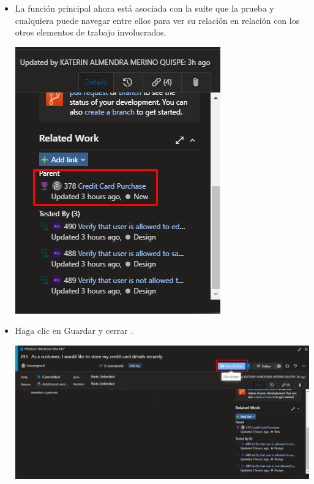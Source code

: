 \begin{itemize}
\item La función principal ahora está asociada con la suite que la prueba y cualquiera puede navegar entre ellos para ver su relación en relación con los otros elementos de trabajo involucrados.
\begin{center}
\includegraphics[width=\columnwidth]{images/27}\newline
\end{center}

\item Haga clic en Guardar y cerrar .
\begin{center}
\includegraphics[width=\columnwidth]{images/28}\newline
\end{center}
\end{itemize}

